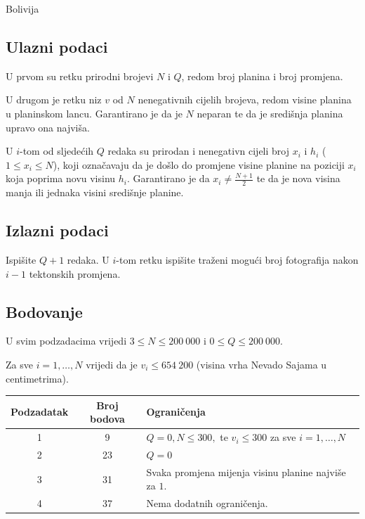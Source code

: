\begin{statement}[
  problempoints=100,
  timelimit=1 sekunda,
  memorylimit=512 MiB,
]{Bolivija}
\subsection*{Ulazni podaci}

U prvom su retku prirodni brojevi $N$ i $Q$, redom broj planina i broj promjena.

U drugom je retku niz $v$ od $N$ nenegativnih cijelih brojeva, redom visine planina u planinskom lancu. 
Garantirano je da je $N$ neparan te da je središnja planina upravo ona najviša. 

U $i$-tom od sljedećih $Q$ redaka su prirodan i nenegativn cijeli broj $x_i$ i $h_i$ ($1 \leq x_i \leq N$), 
koji označavaju da je došlo do promjene visine planine na poziciji $x_i$ koja poprima 
novu visinu $h_i$. Garantirano je da $x_i \ne \frac{N+1}{2}$ te da je nova visina manja 
ili jednaka visini središnje planine. 

\subsection*{Izlazni podaci}

Ispišite $Q + 1$ redaka. U $i$-tom retku ispišite traženi mogući broj fotografija 
nakon $i - 1$ tektonskih promjena. 

\subsection*{Bodovanje}

U svim podzadacima vrijedi $3 \leq N \leq 200~000$ i $0 \leq Q \leq 200~000$. 

Za sve $i = 1, \dots, N$ vrijedi da je $v_i \leq 654~200$ 
(visina vrha Nevado Sajama u centimetrima). 

{\renewcommand{\arraystretch}{1.4}
  \setlength{\tabcolsep}{6pt}
  \begin{tabular}{ccl}
   Podzadatak & Broj bodova & Ograničenja \\ \midrule
    1 & 9 & $Q = 0, N \leq 300,$ te $v_i \leq 300$ za sve $i = 1, \dots, N$ \\
    2 & 23 & $Q = 0$ \\
    3 & 31 & Svaka promjena mijenja visinu planine najviše za $1$.  \\
    4 & 37 & Nema dodatnih ograničenja. \\
\end{tabular}}


\end{statement}
